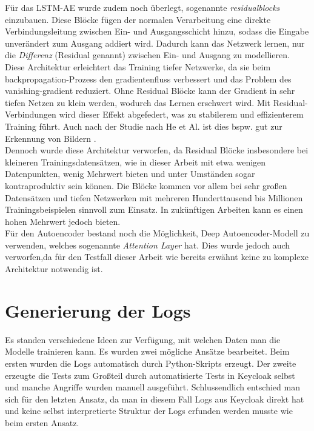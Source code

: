 \documentclass[a4paper,12pt]{article}
\begin{document}
	Für das LSTM-AE wurde zudem noch überlegt, sogenannte \textit{\gls{residualblock}s} einzubauen. Diese Blöcke fügen der normalen Verarbeitung eine direkte Verbindungsleitung zwischen Ein- und Ausgangsschicht hinzu, sodass die Eingabe unverändert zum Ausgang addiert wird. Dadurch kann das Netzwerk lernen, nur die \textit{Differenz} (Residual genannt) zwischen Ein- und Ausgang zu modellieren. Diese Architektur erleichtert das Training tiefer Netzwerke, da sie beim \gls{backpropagation}-Prozess den \gls{gradientenfluss} verbessert und das Problem des \gls{vanishing-gradient} reduziert. Ohne Residual Blöcke kann der Gradient in sehr tiefen Netzen zu klein werden, wodurch das Lernen erschwert wird. Mit Residual-Verbindungen wird dieser Effekt abgefedert, was zu stabilerem und effizienterem Training führt. Auch nach der Studie nach He et Al. ist dies bspw. gut zur Erkennung von Bildern \cite{he2016deep}.
	\\[0.5em]
	Dennoch wurde diese Architektur verworfen, da Residual Blöcke insbesondere bei kleineren Trainingsdatensätzen, wie in dieser Arbeit mit etwa wenigen Datenpunkten, wenig Mehrwert bieten und unter Umständen sogar kontraproduktiv sein können. Die Blöcke kommen vor allem bei sehr großen Datensätzen und tiefen Netzwerken mit mehreren Hunderttausend bis Millionen Trainingsbeispielen sinnvoll zum Einsatz. In zukünftigen Arbeiten kann es einen hohen Mehrwert jedoch bieten.
	\\[0.5em]
	Für den Autoencoder bestand noch die Möglichkeit, Deep Autoencoder-Modell zu verwenden, welches sogenannte \textit{Attention Layer}\cite{najafi2023attention} hat. Dies wurde jedoch auch verworfen,da für den Testfall dieser Arbeit wie bereits erwähnt keine zu komplexe Architektur notwendig ist.


	\section{Generierung der Logs}
	Es standen verschiedene Ideen zur Verfügung, mit welchen Daten man die Modelle trainieren kann. Es wurden zwei mögliche Ansätze bearbeitet. Beim ersten wurden die Logs automatisch durch Python-Skripts erzeugt. Der zweite erzeugte die Tests zum Großteil durch automatisierte Tests in Keycloak selbst und manche Angriffe wurden manuell ausgeführt. Schlussendlich entschied man sich für den letzten Ansatz, da man in diesem Fall Logs aus Keycloak direkt hat und keine selbst interpretierte Struktur der Logs erfunden werden musste wie beim ersten Ansatz.
	
\end{document}
